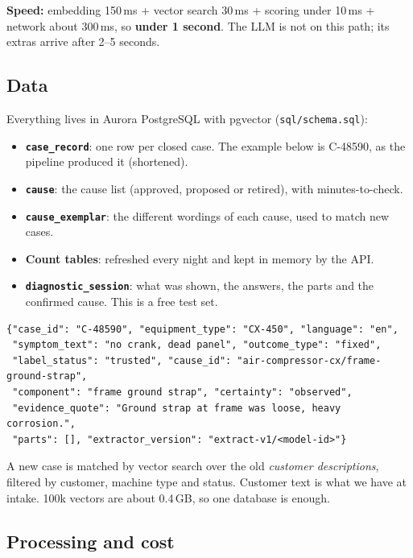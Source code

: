 \documentclass[11pt,a4paper]{article}
\newcommand{\code}[1]{\nolinkurl{#1}}
\begin{document}
\textbf{Speed:} embedding 150\,ms + vector search 30\,ms + scoring under 10\,ms + network about 300\,ms, so \textbf{under 1 second}. The LLM is not on this path; its extras arrive after 2--5 seconds.

\subsection{Data}\label{sec:data}

Everything lives in Aurora PostgreSQL with pgvector (\code{sql/schema.sql}):
\begin{itemize}
  \item \textbf{\code{case_record}}: one row per closed case. The example below is C-48590, as the pipeline produced it (shortened).
  \item \textbf{\code{cause}}: the cause list (approved, proposed or retired), with minutes-to-check.
  \item \textbf{\code{cause_exemplar}}: the different wordings of each cause, used to match new cases.
  \item \textbf{Count tables}: refreshed every night and kept in memory by the API.
  \item \textbf{\code{diagnostic_session}}: what was shown, the answers, the parts and the confirmed cause. This is a free test set.
\end{itemize}

\begin{Verbatim}
{"case_id": "C-48590", "equipment_type": "CX-450", "language": "en",
 "symptom_text": "no crank, dead panel", "outcome_type": "fixed",
 "label_status": "trusted", "cause_id": "air-compressor-cx/frame-ground-strap",
 "component": "frame ground strap", "certainty": "observed",
 "evidence_quote": "Ground strap at frame was loose, heavy corrosion.",
 "parts": [], "extractor_version": "extract-v1/<model-id>"}
\end{Verbatim}

A new case is matched by vector search over the old \emph{customer descriptions}, filtered by customer, machine type and status. Customer text is what we have at intake. 100k vectors are about 0.4\,GB, so one database is enough.

\subsection{Processing and cost}\label{sec:processing}
\end{document}
